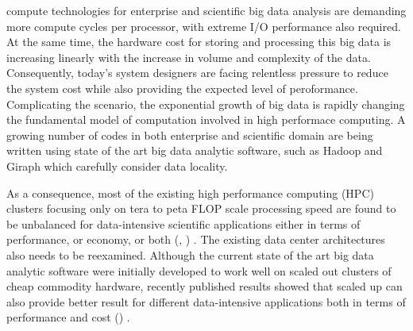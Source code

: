 \documentclass[journal]{IEEEtran}
\begin{document}
 

 compute technologies for enterprise and scientific big data analysis are demanding more compute cycles per processor, with extreme I/O performance also required. At the same time, the hardware cost for storing and processing this big data is increasing linearly with the increase in volume and complexity of the data. Consequently, today's system designers are facing relentless pressure to reduce the system cost while also providing the expected level of peroformance. Complicating the scenario, the exponential growth of big data is rapidly changing the fundamental model of computation involved in high performace computing. A growing number of codes in both enterprise and scientific domain are being written using state of the art big data analytic software, such as Hadoop and Giraph which carefully consider data locality. 


As a consequence, most of the existing high performance  computing (HPC) clusters focusing only on tera to peta FLOP scale processing speed are found to be unbalanced for data-intensive scientific applications either in terms of performance, or economy, or both (\cite{Amdahl:Workloadchang}, \cite{cluster:AmdahlBalancedBlade}) . The existing data center architectures also needs to be reexamined. Although the current state of the art big data analytic software were initially developed to work well on scaled out clusters of cheap commodity hardware, recently published results showed that scaled up can also provide better result for different data-intensive applications both in terms of performance and cost (\cite{scaleupscaleout:appuswamy}) . 
\end{document}
